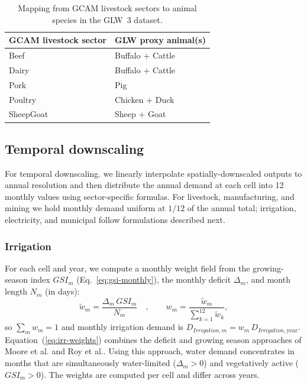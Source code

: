 \documentclass[fleqn,10pt]{wlscirep}
\begin{document}
\begin{table}[!ht]
\centering
\begin{tabular}{ll}
\toprule
\textbf{GCAM livestock sector} & \textbf{GLW proxy animal(s)} \\
\midrule
Beef      & Buffalo + Cattle \\
Dairy     & Buffalo + Cattle \\
Pork      & Pig \\
Poultry   & Chicken + Duck \\
SheepGoat & Sheep + Goat \\
\bottomrule
\end{tabular}
\caption{Mapping from GCAM livestock sectors to animal species in the GLW~3 dataset.}
\label{tab:livestock}
\end{table}

\subsection*{Temporal downscaling}

For temporal downscaling. we linearly interpolate spatially-downscaled outputs to annual resolution and then distribute the annual demand at each cell into 12 monthly values using sector-specific formulas. For livestock, manufacturing, and mining we hold monthly demand uniform at $1/12$ of the annual total; irrigation, electricity, and municipal follow formulations described next.

\subsubsection*{Irrigation}

For each cell and year, we compute a monthly weight field from the growing-season index $GSI_m$ (Eq.~\ref{eq:gsi-monthly}), the monthly deficit $\Delta_m$, and month length $N_m$ (in days):
\begin{equation}
\tilde{w}_m = \frac{\Delta_m \, GSI_m}{N_m}\quad, \qquad w_m = \frac{\tilde{w}_m}{\sum_{k=1}^{12}\tilde{w}_k},
\label{eq:irr-weights}
\end{equation}
so $\sum_m w_m = 1$ and monthly irrigation demand is $D_{Irrigation,m} = w_m \, D_{Irrigation,\mathrm{year}}$. Equation~(\ref{eq:irr-weights}) combines the deficit and growing season approaches of Moore et al.\cite{Moore_2015} and Roy et al.\cite{Roy_2005}. Using this approach, water demand concentrates in months that are simultaneously water-limited ($\Delta_m > 0$) and vegetatively active ($GSI_m > 0$). The weights are computed per cell and differ across years.
\end{document}
